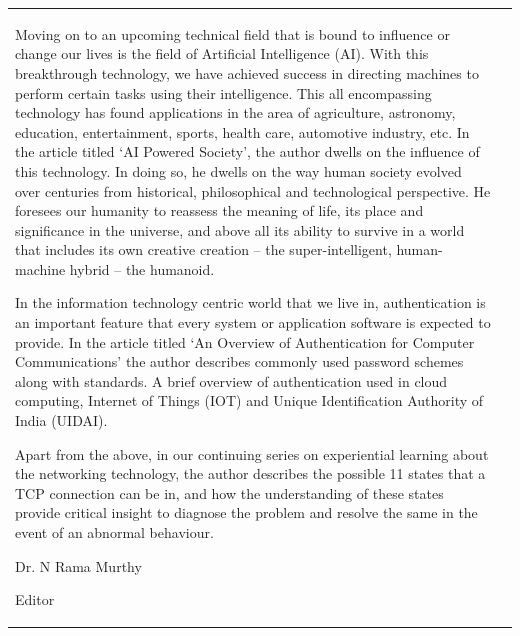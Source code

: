 {\begin{tabular}{p{.2\paperwidth}@{}!{\color{goldan-yellow}\vline width 1.5pt}p{.7\paperwidth}}
\medskip
Moving on to an upcoming technical field that is bound to influence or change our lives is the field of Artificial Intelligence (AI). With this breakthrough technology, we have achieved success in directing machines to perform certain tasks using their intelligence. This all encompassing technology has found applications in the area of agriculture, astronomy, education, entertainment, sports, health care, automotive industry, etc.  In the article titled ‘AI Powered Society’, the author dwells on the influence of this technology. In doing so, he dwells on the way human society evolved over centuries from historical, philosophical and technological perspective.  He foresees our humanity to reassess the meaning of life, its place and significance in the universe, and above all its ability to survive in a world that includes its own creative creation – the super-intelligent, human-machine hybrid – the humanoid.

\medskip
In the information technology centric world that we live in, authentication is an important feature that every system or application software is expected to provide. In the article titled ‘An Overview of Authentication for Computer Communications’ the author describes commonly used password schemes along with standards. A brief overview of authentication used in cloud computing, Internet of Things (IOT) and Unique Identification Authority of India (UIDAI).

\medskip
Apart from the above, in our continuing series on experiential learning about the networking technology, the author describes the possible 11 states that a TCP connection can be in, and how the understanding of these states provide critical insight to diagnose the problem and resolve the same in the event of an abnormal behaviour. 

\vskip 3cm


\bigskip

\hfill  Dr. N Rama Murthy\hspace{2cm}\,

\hfill Editor\hspace{3cm}\,

\end{tabular}
}





